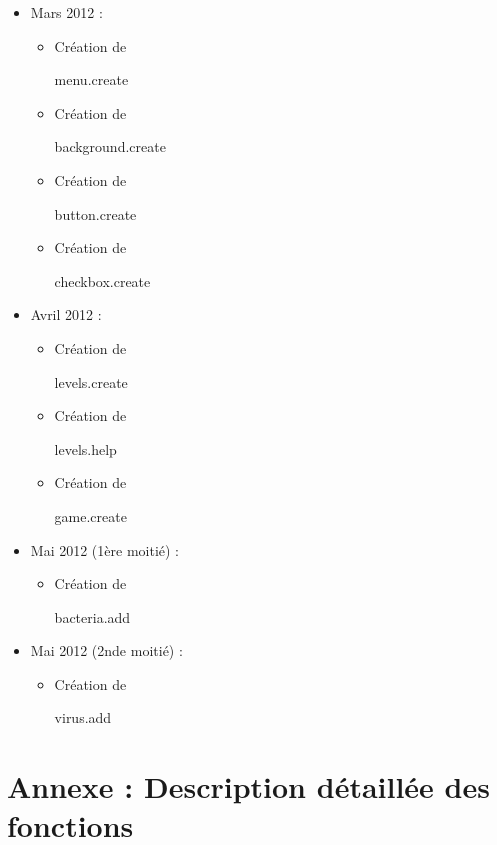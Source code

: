 \documentclass{article}
\begin{document}
\begin{itemize}
\item Mars 2012 : 
  \begin{itemize}
  \item Création de \begin{tt}menu.create\end{tt} 
  \item Création de \begin{tt}background.create\end{tt}
  \item Création de \begin{tt}button.create\end{tt}
  \item Création de \begin{tt}checkbox.create\end{tt}
  \end{itemize}

\item Avril 2012 : 
  \begin{itemize}
  \item Création de \begin{tt}levels.create\end{tt}
  \item Création de \begin{tt}levels.help\end{tt}
  \item Création de \begin{tt}game.create\end{tt}
  \end{itemize}


\item Mai 2012 (1ère moitié) : 
  \begin{itemize}
  \item Création de \begin{tt}bacteria.add\end{tt}
  \end{itemize}

\item Mai 2012 (2nde moitié) :
  \begin{itemize}
  \item Création de \begin{tt}virus.add\end{tt}
  \end{itemize}
\end{itemize}
\newpage
\section{Annexe : Description détaillée des fonctions}
\end{document}
